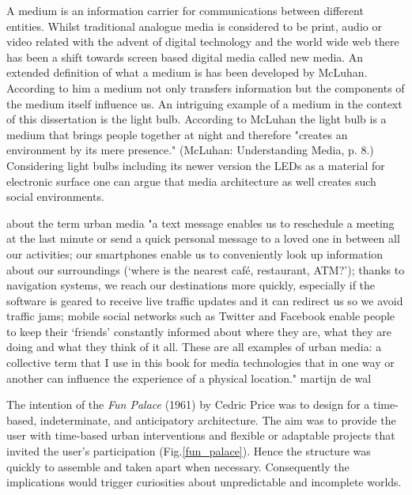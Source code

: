 A medium is an information carrier for communications between different entities. Whilst traditional analogue media is considered to be print, audio or video related with the advent of digital technology and the world wide web there has been a shift towards screen based digital media called new media. 
An extended definition of what a medium is has been developed by McLuhan. According to him a medium not only transfers information but the components of the medium itself influence us.  
An intriguing example of a medium in the context of this dissertation is the light bulb. According to McLuhan the light bulb is a medium that brings people together at night and therefore "creates an environment by its mere presence." (McLuhan: Understanding Media, p. 8.)
Considering light bulbs including its newer version the LEDs as a material for electronic surface one can argue that media architecture as well creates such social environments.

about the term urban media "a text message enables us to reschedule a meeting at the last minute or send a quick personal message to a loved one in between all our activities; our smartphones enable us to conveniently look up information about our surroundings (‘where is the nearest café, restaurant, ATM?’); thanks to navigation systems, we reach our destinations more quickly, especially if the software is geared to receive live traffic updates and it can redirect us so we avoid traffic jams; mobile social networks such as Twitter and Facebook enable people to keep their ‘friends’ constantly informed about where they are, what they are doing and what they think of it all. These are all examples of urban media: a collective term that I use in this book for media technologies that in one way or another can influence the experience of a physical location." martijn de wal


The intention of the \textit{Fun Palace}  (1961) by Cedric Price was   to design for a time-based, indeterminate, and anticipatory architecture.
The aim was to provide the user with time-based urban interventions and flexible or adaptable projects that invited the user’s participation (Fig.\ref{fun_palace}).
Hence the structure was quickly to assemble and taken apart when necessary.
Consequently the implications would trigger curiosities about unpredictable and incomplete worlds.


